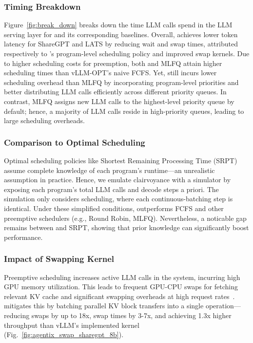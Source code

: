 \subsubsection{Timing Breakdown}

Figure~\ref{fig:break_down} breaks down the time LLM calls spend in the LLM serving layer for \text{\name} and its corresponding baselines. Overall, \text{\name} achieves lower token latency for ShareGPT and LATS by reducing wait and swap times, attributed respectively to \text{\name}'s program-level scheduling policy and improved swap kernels. Due to higher scheduling costs for preemption, both \text{\name} and MLFQ attain higher scheduling times than vLLM-OPT's naive FCFS. Yet, \text{\name} still incurs lower scheduling overhead than MLFQ by incorporating program-level priorities and better distributing LLM calls efficiently across different priority queues. In contrast, MLFQ assigns new LLM calls to the highest-level priority queue by default; hence, a majority of LLM calls reside in high-priority queues, leading to large scheduling overheads.




\subsubsection{Comparison to Optimal Scheduling}

Optimal scheduling policies like Shortest Remaining Processing Time (SRPT) assume complete knowledge of each program’s runtime—an unrealistic assumption in practice. Hence, we emulate clairvoyance with a simulator by exposing each program’s total LLM calls and decode steps a priori. The simulation only considers scheduling, where each continuous-batching step is identical. Under these simplified conditions, \text{\name} outperforms FCFS and other preemptive schedulers (e.g., Round Robin, MLFQ). Nevertheless, a noticable gap remains between \text{\name} and SRPT, showing that prior knowledge can significantly boost performance.



\vspace{1mm}
\subsubsection{Impact of Swapping Kernel} Preemptive scheduling increases active LLM calls in the system, incurring high GPU memory utilization. This leads to frequent GPU-CPU swaps for fetching relevant KV cache and significant swapping overheads at high request rates~\cite{fastserve}. \text{\name} mitigates this by batching parallel KV block transfers into a single operation—reducing swaps by up to 18x, swap times by 3-7x, and achieving 1.3x higher throughput than vLLM's implemented kernel (Fig.~\ref{fig:agentix_swap_sharegpt_8b}).

